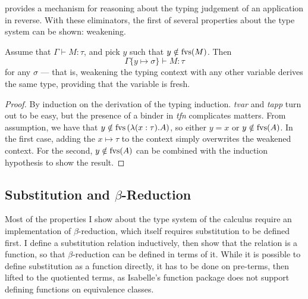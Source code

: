 provides a mechanism for reasoning about the typing judgement of an application in reverse.
With these eliminators, the first of several properties about the type system can be shown: weakening.

\begin{theorem}
Assume that \(\Gamma \vdash M : \tau\), and pick \(y\) such that \(y \notin \mathrm{fvs}(M)\).
Then
\[\Gamma\{y \mapsto \sigma\} \vdash M : \tau\]
for any \(\sigma\) --- that is, weakening the typing context with any other variable derives the same type, providing that the variable is fresh.
\end{theorem}
\begin{proof}
By induction on the derivation of the typing induction.
\emph{tvar} and \emph{tapp} turn out to be easy, but the presence of a binder in \emph{tfn} complicates matters.
From assumption, we have that \(y \notin \mathrm{fvs}\left(\lambda (x:\tau). A\right)\), so either \(y = x\) or \(y \notin \mathrm{fvs}(A)\).
In the first case, adding the \(x \mapsto \tau\) to the context simply overwrites the weakened context.
For the second, \(y \notin \mathrm{fvs}(A)\) can be combined with the induction hypothesis to show the result.
\end{proof}

\subsection{Substitution and \(\beta\)-Reduction}
\label{sec:beta-reduction}
Most of the properties I show about the type system of the calculus require an implementation of \(\beta\)-reduction, which itself requires substitution to be defined first.
I define a substitution relation inductively, then show that the relation is a function, so that \(\beta\)-reduction can be defined in terms of it.
While it is possible to define substitution as a function directly, it has to be done on pre-terms, then lifted to the quotiented terms, as Isabelle's function package does not support defining functions on equivalence classes.

